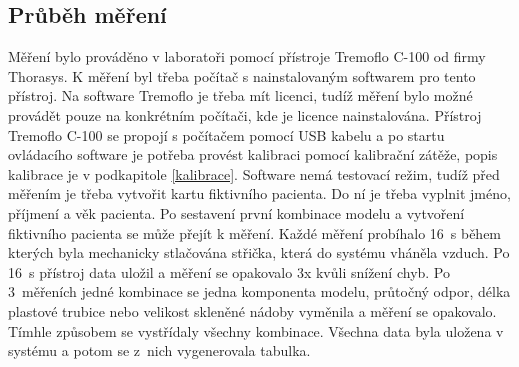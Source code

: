 \subsection{Průběh měření}
Měření bylo prováděno v laboratoři pomocí přístroje Tremoflo C-100 od firmy Thorasys. K měření byl třeba počítač s nainstalovaným softwarem pro tento přístroj. Na software Tremoflo je třeba mít licenci, tudíž měření bylo možné provádět pouze na konkrétním počítači, kde je licence nainstalována. Přístroj Tremoflo C-100 se propojí s počítačem pomocí USB kabelu a po startu ovládacího software je potřeba provést kalibraci pomocí kalibrační zátěže, popis kalibrace je v podkapitole \ref{kalibrace}. Software nemá testovací režim, tudíž před měřením je třeba vytvořit kartu fiktivního pacienta. Do ní je třeba vyplnit  jméno, příjmení a věk pacienta. Po sestavení první kombinace modelu a vytvoření fiktivního pacienta se může přejít k měření. Každé měření probíhalo  \SI{16}{s} během kterých byla mechanicky stlačována střička, která do systému vháněla vzduch. Po  \SI{16}{s} přístroj data uložil a měření se opakovalo 3x kvůli snížení chyb. Po 3~měřeních jedné kombinace se jedna komponenta modelu, průtočný odpor, délka plastové trubice nebo velikost skleněné nádoby vyměnila a měření se opakovalo. Tímhle způsobem se vystřídaly všechny kombinace. Všechna data byla uložena v systému a potom se z~nich vygenerovala tabulka.

